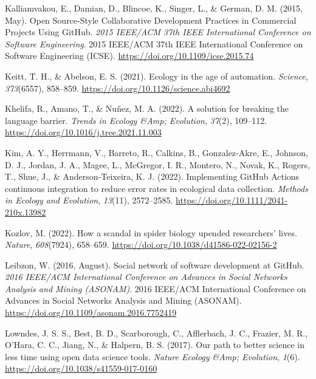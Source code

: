\begin{CSLReferences}{1}{0}
\leavevmode{}%
Kalliamvakou, E., Damian, D., Blincoe, K., Singer, L., \& German, D. M. (2015, May). Open Source-Style Collaborative Development Practices in Commercial Projects Using GitHub. \emph{2015 IEEE/ACM 37th IEEE International Conference on Software Engineering}. 2015 IEEE/ACM 37th IEEE International Conference on Software Engineering (ICSE). \url{https://doi.org/10.1109/icse.2015.74}

\leavevmode{}%
Keitt, T. H., \& Abelson, E. S. (2021). Ecology in the age of automation. \emph{Science}, \emph{373}(6557), 858--859. \url{https://doi.org/10.1126/science.abi4692}

\leavevmode{}%
Khelifa, R., Amano, T., \& Nuñez, M. A. (2022). A solution for breaking the language barrier. \emph{Trends in Ecology \&Amp; Evolution}, \emph{37}(2), 109--112. \url{https://doi.org/10.1016/j.tree.2021.11.003}

\leavevmode{}%
Kim, A. Y., Herrmann, V., Barreto, R., Calkins, B., Gonzalez‐Akre, E., Johnson, D. J., Jordan, J. A., Magee, L., McGregor, I. R., Montero, N., Novak, K., Rogers, T., Shue, J., \& Anderson‐Teixeira, K. J. (2022). Implementing GitHub Actions continuous integration to reduce error rates in ecological data collection. \emph{Methods in Ecology and Evolution}, \emph{13}(11), 2572--2585. \url{https://doi.org/10.1111/2041-210x.13982}

\leavevmode{}%
Kozlov, M. (2022). How a scandal in spider biology upended researchers' lives. \emph{Nature}, \emph{608}(7924), 658--659. \url{https://doi.org/10.1038/d41586-022-02156-2}

\leavevmode{}%
Leibzon, W. (2016, August). Social network of software development at GitHub. \emph{2016 IEEE/ACM International Conference on Advances in Social Networks Analysis and Mining (ASONAM)}. 2016 IEEE/ACM International Conference on Advances in Social Networks Analysis and Mining (ASONAM). \url{https://doi.org/10.1109/asonam.2016.7752419}

\leavevmode{}%
Lowndes, J. S. S., Best, B. D., Scarborough, C., Afflerbach, J. C., Frazier, M. R., O'Hara, C. C., Jiang, N., \& Halpern, B. S. (2017). Our path to better science in less time using open data science tools. \emph{Nature Ecology \&Amp; Evolution}, \emph{1}(6). \url{https://doi.org/10.1038/s41559-017-0160}


\end{CSLReferences}
